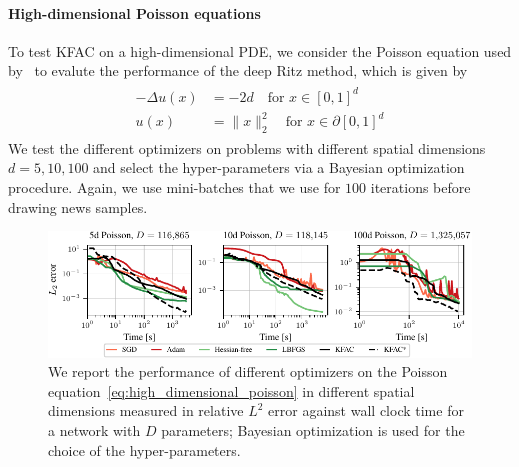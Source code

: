 \paragraph{High-dimensional Poisson equations}
To test KFAC on a high-dimensional PDE, we consider the Poisson equation used by~\cite{yu2018deep} to evalute the performance of the deep Ritz method, which is given by 
\begin{align}\label{eq:high_dimensional_poisson}
    \begin{split}
        -\Delta u(x) & = -2d \quad \text{for } x\in [0,1]^{d} \\
    u(x) & = \lVert x \rVert_2^2 \quad \text{for } x\in \partial[0,1]^{d}
    \end{split}
\end{align}
We test the different optimizers on problems with different spatial dimensions $d=5, 10, 100$ and select the hyper-parameters via a Bayesian optimization procedure. 
Again, we use mini-batches that we use for $100$ iterations before drawing news samples. 

\begin{figure}
    \centering
    \includegraphics{../kfac_pinns_exp/exp33_poisson_bayes_groupplot/l2_error_over_time.pdf}
    \caption{
    We report the performance of different optimizers on the Poisson equation~\eqref{eq:high_dimensional_poisson} in different spatial dimensions measured in relative $L^2$ error against wall clock time for a network with $D$ parameters; Bayesian optimization is used for the choice of the hyper-parameters.
    }
    \label{fig:10D-Poisson}
\end{figure}


